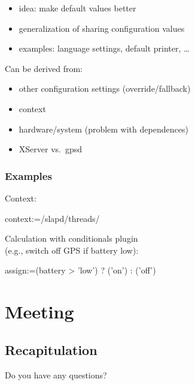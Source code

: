 \begin{frame}
	\begin{itemize}
	\item idea: make default values better
	\item generalization of sharing configuration values
	\item examples: language settings, default printer, \dots
	\end{itemize}
	\pause
	\vspace{1cm}
	Can be derived from:
	\begin{itemize}
	\item other configuration settings (override/fallback)
	\item context~\cite{raab2017introducing}
	\item hardware/system (problem with dependences)
	\pause
	\vspace{1cm}
	\item XServer vs.\ gpsd
	\end{itemize}
\end{frame}

\begin{frame}[fragile]
	\frametitle{Examples}
	Context:
	\begin{code}
	context:=/slapd/threads/%
	\end{code}

	\pause
	\vspace{1cm}
	Calculation with conditionals plugin
	\\ (e.g., switch off GPS if battery low):
	\begin{code}
	assign:=(battery > 'low') ? ('on') : ('off')
	\end{code}
\end{frame}

\section{Meeting}

\subsection{Recapitulation}

\begin{frame}
	\begin{task}
	Do you have any questions?
	\end{task}
\end{frame}

